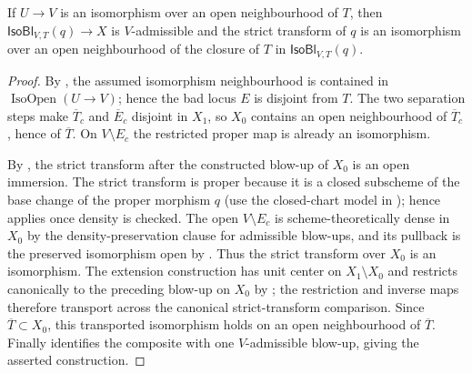 \begin{lemma}
  \label{lemma:nagata-isomorphism-near-closure}
  \leanok

  If $U\to V$ is an isomorphism over an open neighbourhood of $T$, then
  $\mathsf{IsoBl}_{V,T}(q)\to X$ is $V$-admissible and the strict transform
  of $q$ is an isomorphism over an open neighbourhood of the closure of $T$
  in $\mathsf{IsoBl}_{V,T}(q)$.
\end{lemma}

\begin{proof}
  \leanok
  By , the assumed isomorphism
  neighbourhood is contained in $\operatorname{IsoOpen}(U\to V)$; hence the
  bad locus $E$ is disjoint from $T$.  The two separation steps make
  $\overline T_c$ and $\overline E_c$
  disjoint in $X_1$, so $X_0$ contains an open neighbourhood of
  $\overline T_c$, hence of $\overline T$.  On
  $V\setminus E_c$ the restricted proper map is already an isomorphism.

  By , the strict transform after
  the constructed blow-up of $X_0$ is an open immersion.  The strict transform
  is proper because it is a closed subscheme of the base change of the proper
  morphism $q$ (use the closed-chart model in
  ); hence
   applies once density is checked.
  The open $V\setminus E_c$ is scheme-theoretically dense in $X_0$ by the
  density-preservation clause for admissible blow-ups, and its pullback is the
  preserved isomorphism open by
  .  Thus the strict
  transform over $X_0$ is an isomorphism.  The extension construction has
  unit center on $X_1\setminus X_0$ and restricts canonically to the preceding
  blow-up on $X_0$ by
  ; the restriction and inverse
  maps therefore transport across the canonical strict-transform comparison.
  Since $\overline T\subset X_0$, this transported isomorphism holds on an
  open neighbourhood of $\overline T$.  Finally
   identifies the composite with one
  $V$-admissible blow-up, giving the asserted construction.
\end{proof}


